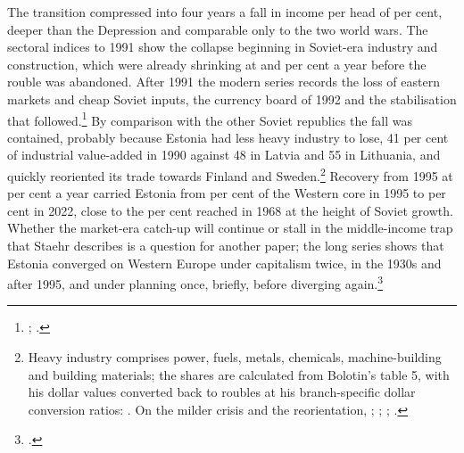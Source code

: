 The transition compressed into four years a fall in income per head of \eeTROUGHpct{} per cent, deeper than the Depression and comparable only to the two world wars. The sectoral indices to 1991 show the collapse beginning in Soviet-era industry and construction, which were already shrinking at  and  per cent a year before the rouble was abandoned. After 1991 the modern series records the loss of eastern markets and cheap Soviet inputs, the currency board of 1992 and the stabilisation that followed.\footnote{\autocite[2--7]{wb1993estonia}; \autocite[482--509]{shteinbuka1993}.} By comparison with the other Soviet republics the fall was contained, probably because Estonia had less heavy industry to lose, 41 per cent of industrial value-added in 1990 against 48 in Latvia and 55 in Lithuania, and quickly reoriented its trade towards Finland and Sweden.\footnote{Heavy industry comprises power, fuels, metals, chemicals, machine-building and building materials; the shares are calculated from Bolotin's table 5, with his dollar values converted back to roubles at his branch-specific dollar conversion ratios: \autocite[190]{bolotin1992}. On the milder crisis and the reorientation, \autocite[164]{norkus_restorations}; \autocite[22]{transition_greenes}; \autocite[117]{baltistates_smith_estonia}; \autocite[454]{transition_progress}.} Recovery from 1995 at  per cent a year carried Estonia from  per cent of the Western core in 1995 to  per cent in 2022, close to the  per cent reached in 1968 at the height of Soviet growth. Whether the market-era catch-up will continue or stall in the middle-income trap that Staehr describes is a question for another paper; the long series shows that Estonia converged on Western Europe under capitalism twice, in the 1930s and after 1995, and under planning once, briefly, before diverging again.\footnote{\autocite[274--80]{staehr2015}.}
